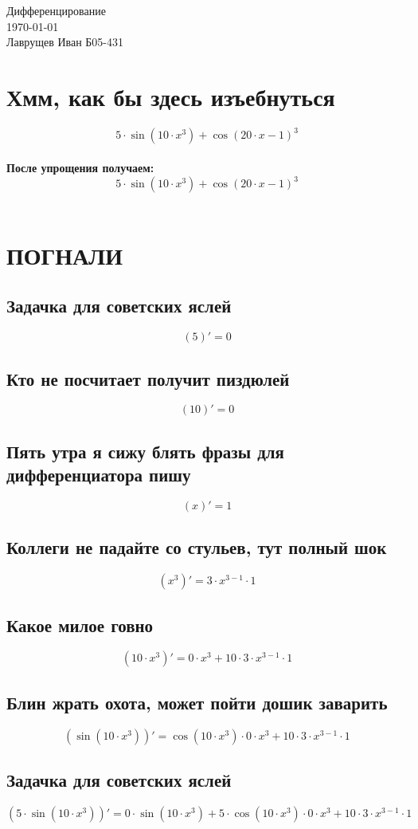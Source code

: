 \documentclass[12pt]{article}
\begin{document}
\begingroup
    \centering
    \LARGE Дифференцирование\\
    \large \today \\[0.5em]
    \large Лаврущев Иван Б05-431\par
\endgroup
\tableofcontents
\section{Хмм, как бы здесь изъебнуться}
$$5 \cdot \sin(10 \cdot x^{3}) + \cos(20 \cdot x - 1)^{3}$$\\
\textbf{После упрощения получаем:}\\
$$5 \cdot \sin(10 \cdot x^{3}) + \cos(20 \cdot x - 1)^{3}$$\\
\section{ПОГНАЛИ}
\subsection{Задачка для советских яслей}
$$(5)' = 0$$
\subsection{Кто не посчитает получит пиздюлей}
$$(10)' = 0$$
\subsection{Пять утра я сижу блять фразы для дифференциатора пишу}
$$(x)' = 1$$
\subsection{Коллеги не падайте со стульев, тут полный шок}
$$(x^{3})' = 3 \cdot x^{3 - 1} \cdot 1$$
\subsection{Какое милое говно}
$$(10 \cdot x^{3})' = 0 \cdot x^{3} + 10 \cdot 3 \cdot x^{3 - 1} \cdot 1$$
\subsection{Блин жрать охота, может пойти дошик заварить}
$$(\sin(10 \cdot x^{3}))' = \cos(10 \cdot x^{3}) \cdot 0 \cdot x^{3} + 10 \cdot 3 \cdot x^{3 - 1} \cdot 1$$
\subsection{Задачка для советских яслей}
$$(5 \cdot \sin(10 \cdot x^{3}))' = 0 \cdot \sin(10 \cdot x^{3}) + 5 \cdot \cos(10 \cdot x^{3}) \cdot 0 \cdot x^{3} + 10 \cdot 3 \cdot x^{3 - 1} \cdot 1$$
\end{document}
